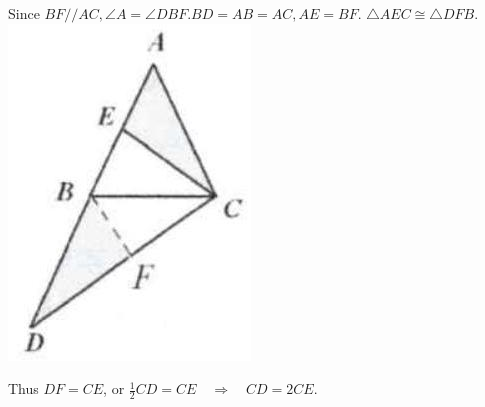\documentclass{article}
\begin{document}
Since \(B F / / A C, \angle A=\angle D B F . B D=A B=A C, A E=B F\). \(\triangle A E C \cong \triangle D F B\).\\
\centering
\includegraphics[width=\textwidth]{images/039(1).jpg}

Thus \(D F=C E\), or \(\frac{1}{2} C D=C E \quad \Rightarrow \quad C D=2 C E\).
\end{document}
